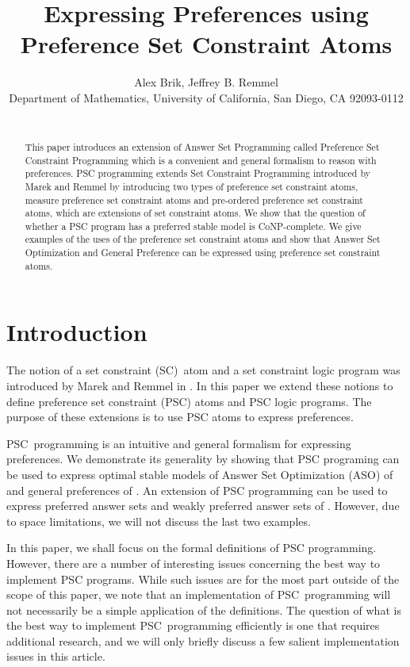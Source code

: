 \documentclass[letterpaper]{article}\usepackage{aaai}
\begin{document}
\title{Expressing Preferences using Preference Set Constraint Atoms}
\author{Alex Brik, Jeffrey B. Remmel\\Department of Mathematics, University of California, San Diego, CA 92093-0112\\\ }
\maketitle

\begin{abstract}
This paper introduces an extension of Answer Set Programming called Preference
Set Constraint Programming which is a convenient and general formalism to
reason with preferences. PSC programming extends Set Constraint Programming
introduced by Marek and Remmel \cite{MR} by introducing two types of
preference set constraint atoms, measure preference set constraint atoms and
pre-ordered preference set constraint atoms, which are extensions of set
constraint atoms. We show that the question of whether a PSC program has a
preferred stable model is CoNP-complete. We give examples of the uses of the
preference set constraint atoms and show that Answer Set Optimization
\cite{BNT03} and General Preference \cite{SP} can be expressed using
preference set constraint atoms.

\end{abstract}

\section{\bigskip Introduction}

The notion of a set constraint (SC)\ atom and a set constraint logic program
was introduced by Marek and Remmel in \cite{MR}. In this paper we extend these
notions to define preference set constraint (PSC) atoms and PSC logic
programs. The purpose of these extensions is to use PSC atoms to express preferences.

PSC\ programming is an intuitive and general formalism for expressing
preferences. We demonstrate its generality by showing that PSC programing can
be used to express optimal stable models of Answer Set Optimization (ASO) of
\cite{BNT03} and general preferences of \cite{SP}. An extension of PSC
programming can be used to express preferred answer sets and weakly preferred
answer sets of \cite{BrewkaE99}. However, due to space limitations, we will
not discuss the last two examples.

In this paper, we shall focus on the formal definitions of PSC programming.
However, there are a number of interesting issues concerning the best way to
implement PSC programs. While such issues are for the most part outside of the
scope of this paper, we note that an implementation of PSC\ programming will
not necessarily be a simple application of the definitions. The question of
what is the best way to implement PSC\ programming efficiently is one that
requires additional research, and we will only briefly discuss a few salient
implementation issues in this article.
\end{document}
